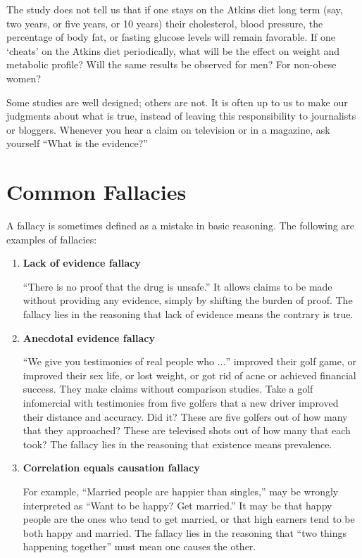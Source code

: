 \documentclass[11pt]{book}\usepackage[]{graphicx}\usepackage[]{color}
\begin{document}
The study does not tell us that if one stays on the Atkins diet long term (say, two years, or five years, or 10 years) their cholesterol, blood pressure, the percentage of body fat, or fasting glucose levels will remain favorable.  If one ‘cheats’ on the Atkins diet periodically, what will be the effect on weight and metabolic profile?  Will the same results be observed for men?  For non-obese women?

Some studies are well designed; others are not.  It is often up to us to make our judgments about what is true, instead of leaving this responsibility to journalists or bloggers.  Whenever you hear a claim on television or in a magazine, ask yourself ``What is the evidence?''

\section{Common Fallacies}

A fallacy is sometimes defined as a mistake in basic reasoning. The following are examples of fallacies:

\begin{enumerate}
\item \textbf{Lack of evidence fallacy}

``There is no proof that the drug is unsafe.''  It allows claims to be made without providing any evidence, simply by shifting the burden of proof.  The fallacy lies in the reasoning that lack of evidence means the contrary is true.

\item \textbf{Anecdotal evidence fallacy}

``We give you testimonies of real people who $\dots$'' improved their golf game, or improved their sex life, or lost weight, or got rid of acne or achieved financial success.  They make claims without comparison studies.  Take a golf infomercial with testimonies from five golfers that a new driver improved their distance and accuracy.  Did it?  These are five golfers out of how many that they approached?  These are televised shots out of how many that each took?  The fallacy lies in the reasoning that existence means prevalence.

\item \textbf{Correlation equals causation fallacy}

For example, ``Married people are happier than singles,''  may be wrongly interpreted as ``Want to be happy? Get married.''  It may be that happy people are the ones who tend to get married, or that high earners tend to be both happy and married.  The fallacy lies in the reasoning that ``two things happening together'' must mean one causes the other.
\end{enumerate}
\end{document}
